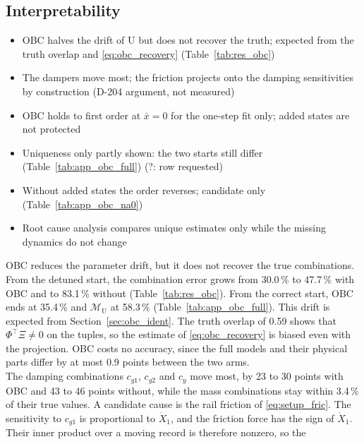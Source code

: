 \subsection{Interpretability}
\ifdraft
\begin{itemize}
\item OBC halves the drift of U but does not recover the truth; expected from the truth overlap and \eqref{eq:obc_recovery} (Table~\ref{tab:res_obc})
\item The dampers move most; the friction projects onto the damping sensitivities by construction (D-204 argument, not measured)
\item OBC holds to first order at $\bar x=0$ for the one-step fit only; added states are not protected
\item Uniqueness only partly shown: the two starts still differ (Table~\ref{tab:app_obc_full}) (?: row requested)
\item Without added states the order reverses; candidate only (Table~\ref{tab:app_obc_na0})
\item Root cause analysis compares unique estimates only while the missing dynamics do not change
\end{itemize}
\fi
OBC reduces the parameter drift, but it does not recover the true
combinations.
From the detuned start, the combination error grows from 30.0\,\% to
47.7\,\% with OBC and to 83.1\,\% without (Table~\ref{tab:res_obc}).
From the correct start, OBC ends at 35.4\,\% and $\mathcal M_{\mathrm U}$ at
58.3\,\% (Table~\ref{tab:app_obc_full}).
This drift is expected from Section~\ref{sec:obc_ident}.
The truth overlap of 0.59 shows that $\Phi^\top\Xi\neq0$ on the tuples, so
the estimate of \eqref{eq:obc_recovery} is biased even with the projection.
OBC costs no accuracy, since the full models and their physical parts differ
by at most 0.9 points between the two arms.
\\
The damping combinations $c_{g1}$, $c_{g2}$ and $c_y$ move most, by 23 to
30 points with OBC and 43 to 46 points without, while the mass combinations
stay within 3.4\,\% of their true values.
A candidate cause is the rail friction of \eqref{eq:setup_fric}.
The sensitivity to $c_{g1}$ is proportional to $\dot X_1$, and the friction
force has the sign of $\dot X_1$.
Their inner product over a moving record is therefore nonzero, so the
